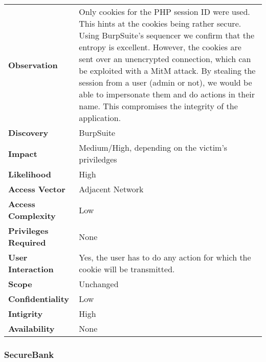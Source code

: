 \begin{tabular}{l|p{10cm}}
\textbf{Observation} & Only cookies for the PHP session ID were used. This hints at the cookies being rather secure. Using BurpSuite's sequencer we confirm that the entropy is excellent. However, the cookies are sent over an unencrypted connection, which can be exploited with a MitM attack. By stealing the session from a user (admin or not), we would be able to impersonate them and do actions in their name. This compromises the integrity of the application. \\
\textbf{Discovery} & BurpSuite \\
\textbf{Impact} &Medium/High, depending on the victim's priviledges \\
\textbf{Likelihood} & High \\
\textbf{Access Vector} & Adjacent Network \\
\textbf{Access Complexity} & Low\\
\textbf{Privileges Required} & None \\
\textbf{User Interaction} & Yes, the user has to do any action for which the cookie will be transmitted. \\
\textbf{Scope} & Unchanged \\
\textbf{Confidentiality} & Low \\
\textbf{Intigrity} & High\\
\textbf{Availability} & None \\
\end{tabular}

\subsubsection*{SecureBank}

